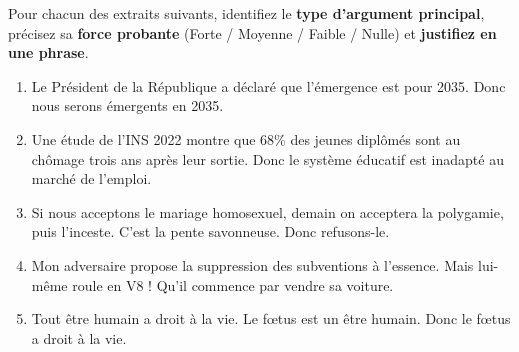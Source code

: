 \documentclass[11pt]{article}
\begin{document}
\begin{exercice}
Pour chacun des extraits suivants, identifiez le \textbf{type d'argument principal}, précisez sa \textbf{force probante} (Forte / Moyenne / Faible / Nulle) et \textbf{justifiez en une phrase}.
\begin{enumerate}
    \item \guillemotleft Le Président de la République a déclaré que l'émergence est pour 2035. Donc nous serons émergents en 2035. \guillemotright
    \item \guillemotleft Une étude de l'INS 2022 montre que 68\% des jeunes diplômés sont au chômage trois ans après leur sortie. Donc le système éducatif est inadapté au marché de l'emploi. \guillemotright
    \item \guillemotleft Si nous acceptons le mariage homosexuel, demain on acceptera la polygamie, puis l'inceste. C'est la pente savonneuse. Donc refusons-le. \guillemotright
    \item \guillemotleft Mon adversaire propose la suppression des subventions à l'essence. Mais lui-même roule en V8 ! Qu'il commence par vendre sa voiture. \guillemotright
    \item \guillemotleft Tout être humain a droit à la vie. Le fœtus est un être humain. Donc le fœtus a droit à la vie. \guillemotright
\end{enumerate}
\end{exercice}
\end{document}
